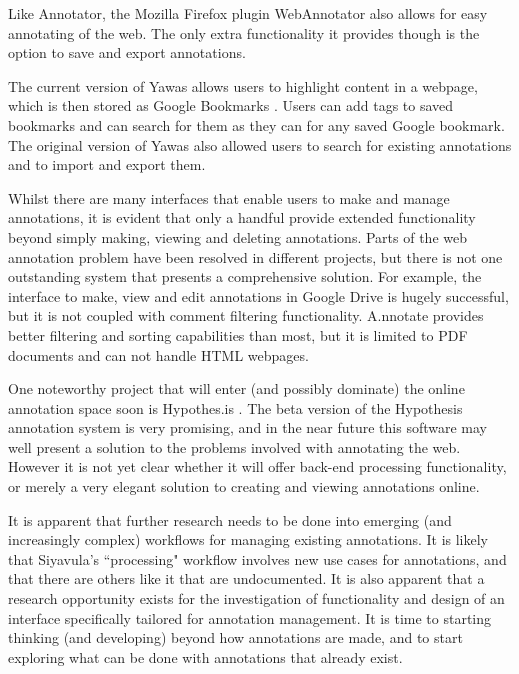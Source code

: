 Like Annotator, the Mozilla Firefox plugin WebAnnotator \citep{WebAnnotator1} \citep{WebAnnotator2} also allows for easy annotating of the web. The only extra functionality it provides though is the option to save and export annotations. 

The current version of Yawas \citep{YawasLink} allows users to highlight content in a webpage, which is then stored as Google Bookmarks \citep{GBookmarks}. Users can add tags to saved bookmarks and can search for them as they can for any saved Google bookmark. The original version of Yawas \citep{Yawas} also allowed users to search for existing annotations and to import and export them. 

Whilst there are many interfaces that enable users to make and manage annotations, it is evident that only a handful provide extended functionality beyond simply making, viewing and deleting annotations. Parts of the web annotation problem have been resolved in different projects, but there is not one outstanding system that presents a comprehensive solution. For example, the interface to make, view and edit annotations in Google Drive is hugely successful, but it is not coupled with comment filtering functionality. A.nnotate provides better filtering and sorting capabilities than most, but it is limited to PDF documents and can not handle HTML webpages. 

One noteworthy project that will enter (and possibly dominate) the online annotation space soon is Hypothes.is \citep{Hypothesis}. The beta version of the Hypothesis annotation system is very promising, and in the near future this software may well present a solution to the problems involved with annotating the web. However it is not yet clear whether it will offer back-end processing functionality, or merely a very elegant solution to creating and viewing annotations online.

It is apparent that further research needs to be done into emerging (and increasingly complex) workflows for managing existing annotations. It is likely that Siyavula's ``processing" workflow involves new use cases for annotations, and that there are others like it that are undocumented. It is also apparent that a research opportunity exists for the investigation of functionality and design of an interface specifically tailored for annotation management. It is time to starting thinking (and developing) beyond how annotations are made, and to start exploring what can be done with annotations that already exist. 
